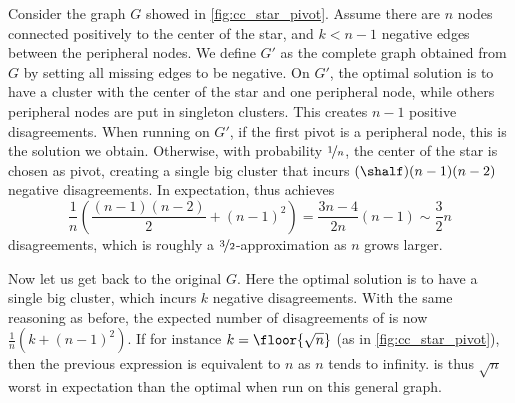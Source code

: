 \begin{aside}
   Consider the graph $G$ showed in \autoref{fig:cc_star_pivot}. Assume there are $n$ nodes
   connected positively to the center of the star, and $k<n-1$ negative edges between the peripheral
   nodes. We define $G'$ as the complete graph obtained from $G$ by setting all missing edges to be
   negative. On $G'$, the optimal solution is to have a cluster with the center of the star and one
   peripheral node, while others peripheral nodes are put in singleton clusters. This creates $n-1$
   positive disagreements. When running \ccpivot{} on $G'$, if the first pivot is a peripheral node,
   this is the solution we obtain. Otherwise, with probability $\nicefrac{1}{n}$, the center of the
   star is chosen as pivot, creating a single big cluster that incurs $(\shalf)(n-1)(n-2)$ negative
   disagreements. In expectation, \ccpivot{} thus achieves \[
   \frac{1}{n}\left(\frac{(n-1)(n-2)}{2}+(n-1)^2\right)=\frac{3n-4}{2n}(n-1)\sim \frac{3}{2}n \]
   disagreements, which is roughly a $\nicefrac{3}{2}$-approximation as $n$ grows larger.

   Now let us get back to the original $G$. Here the optimal solution is to have a single big
   cluster, which incurs $k$ negative disagreements. With the same reasoning as before, the expected
   number of disagreements of \ccpivot{} is now $\frac{1}{n}\left(k+(n-1)^2\right)$. If for
   instance $k=\floor{\sqrt{n}}$ (as in \autoref{fig:cc_star_pivot}), then the previous expression
   is equivalent to $n$ as $n$ tends to infinity. \ccpivot{} is thus $\sqrt{n}$ worst in expectation
   than the optimal when run on this general graph.
\end{aside}

